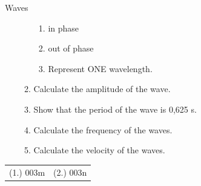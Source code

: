 \begin{eocexercises}{Waves}
\begin{enumerate}[noitemsep, label=\textbf{\arabic*}. ]
\begin{enumerate}[noitemsep, label=\textbf{\alph*}. ]
\label{m38806*uid0821323}\begin{enumerate}[noitemsep, label=\textbf{\roman*}. ] 
            \item in phase\item out of phase\item Represent ONE wavelength.\end{enumerate}
        \item Calculate the amplitude of the wave.\item Show that the period of the wave is 0,625 s.\item Calculate the frequency of the waves.\item Calculate the velocity of the waves.\end{enumerate}
         \end{enumerate}
  \label{m38806**end}
\par \practiceinfo
 \par \begin{tabular}[h]{cc}
(1.) 003m  &  (2.) 003n  & \end{tabular}

\end{eocexercises}
